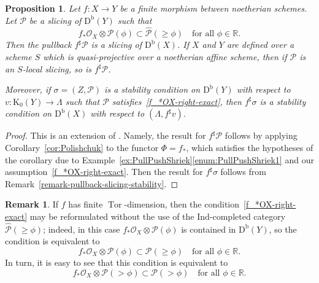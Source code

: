 \documentclass[11pt, reqno]{amsart}
\numberwithin{equation}{section}
\theoremstyle{plain}
\newtheorem{proposition}[theorem]{Proposition}
\theoremstyle{remark}
\theoremstyle{definition}
\newtheorem{remark}[theorem]{Remark}
\theoremstyle{italicsname}
\newcommand{\Db}{\mathrm{D^b}}
\DeclareMathOperator{\Spec}{Spec}
\DeclareMathOperator{\Tor}{Tor}
\newcommand{\cO}{\mathcal{O}}
\newcommand{\cP}{\mathscr{P}}
\newcommand{\rK}{\mathrm{K}}
\def\RR{\ensuremath{\mathbb{R}}}
\def\ZZ{\ensuremath{\mathbb{Z}}}
\begin{document}
\begin{proposition}\label{proposition-pullback-stability}
Let $f \colon X \to Y$ be a finite morphism between noetherian schemes.
Let $\cP$ be a slicing of $\Db(Y)$ such that  
\begin{equation}\label{f_*OX-right-exact}
f_*\cO_X \otimes\cP(\phi)\subset\widehat{\cP}  (\geq\phi) \quad \text{for all } \phi \in \RR.
\end{equation}
Then the pullback $f^{\sharp}\cP$ is a slicing of $\Db(X)$. 
If $X$ and $Y$ are defined over a scheme $S$ which is quasi-projective over a noetherian affine scheme, then if $\cP$ is an $S$-local slicing, so is $f^{\sharp}\cP$. 

Moreover, if $\sigma=(Z,\cP)$ is a stability condition on $\Db(Y)$ with respect to $v \colon \rK_0(Y) \to \Lambda$ such that $\cP$ satisfies~\eqref{f_*OX-right-exact}, then $f^{\sharp}\sigma$ is a stability condition on $\Db(X)$ with respect to $(\Lambda,f^{\sharp} v)$.
\end{proposition}

\begin{proof}
This is an extension of \cite[Corollary 2.2.2]{P-t-structures}. 
Namely, the result for $f^{\sharp}\cP$ follows by applying Corollary~\ref{cor:Polishchuk} 
to the functor $\Phi=f_*$, which satisfies the hypotheses of the corollary due to Example~\ref{ex:PullPushShriek}\ref{enum:PullPushShriek1} and our assumption~\eqref{f_*OX-right-exact}. 
Then the result for $f^{\sharp}\sigma$ follows from Remark~\ref{remark-pullback-slicing-stability}.
\end{proof}

\begin{remark}
\label{remark-finite-tor-dimension-f_*OX-right-exact}
If $f$ has finite $\Tor$-dimension, then the condition~\eqref{f_*OX-right-exact} may be reformulated without the use of the Ind-completed category $\widehat{\cP}(\geq \phi)$; indeed, in this case $f_* \cO_X \otimes \cP(\phi)$ is contained in $\Db(Y)$, so the condition is equivalent to 
    \begin{equation*} 
f_*\cO_X \otimes\cP(\phi)\subset {\cP}  (\geq\phi) \quad \text{for all } \phi \in \RR.
\end{equation*}
In turn, it is easy to see that this condition is equivalent to 
\begin{equation*}
    f_*\cO_X \otimes\cP(>\phi) \subset \cP(> \phi) \quad \text{for all } \phi \in \RR. 
\end{equation*}
\end{remark}
\end{document}
